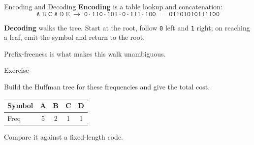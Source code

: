 \documentclass[10pt,aspectratio=169]{beamer}
\begin{document}
\begin{frame}{Encoding and Decoding}
  \textbf{Encoding} is a table lookup and concatenation:
  \[
    \texttt{A B C A D E} \;\longrightarrow\;
    \texttt{0} \cdot \texttt{110} \cdot \texttt{101} \cdot \texttt{0}
    \cdot \texttt{111} \cdot \texttt{100}
    \;=\; \texttt{01101010111100}
  \]

  \pause
  \bigskip
  \textbf{Decoding} walks the tree. Start at the root, follow \texttt{0} left
  and \texttt{1} right; on reaching a leaf, emit the symbol and return to the
  root.

  \bigskip
  \begin{center}
  \end{center}

  \bigskip
  \begin{center}
    \small Prefix-freeness is what makes this walk unambiguous.
  \end{center}
\end{frame}

\begin{frame}{Exercise}
  \begin{center}
    Build the Huffman tree for these frequencies and give the total cost.
  \end{center}

  \bigskip
  \begin{center}
  \begin{tabular}{lcccc}
    \toprule
    Symbol & A & B & C & D \\
    \midrule
    Freq   & 5 & 2 & 1 & 1 \\
    \bottomrule
  \end{tabular}
  \end{center}

  \bigskip
  \begin{center}
    \small Compare it against a fixed-length code.
  \end{center}
\end{frame}
\end{document}
